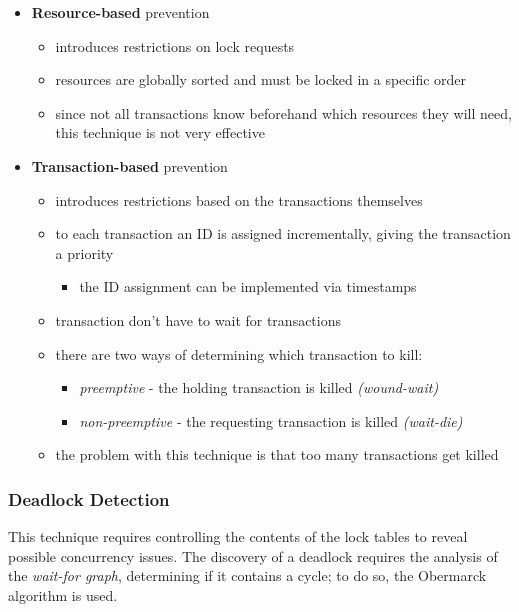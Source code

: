 \documentclass[english]{article}
\begin{document}
\begin{itemize}
  \item \textbf{Resource-based} prevention
        \begin{itemize}
          \item introduces restrictions on lock requests
          \item resources are globally sorted and must be locked in a specific order
          \item since not all transactions know beforehand which resources they will need, this technique is not very effective
        \end{itemize}
  \item \textbf{Transaction-based} prevention
        \begin{itemize}
          \item introduces restrictions based on the transactions themselves
          \item to each transaction an ID is assigned incrementally, giving the transaction a priority
                \begin{itemize}
                  \item the ID assignment can be implemented via timestamps
                \end{itemize}
          \item {} transaction don't have to wait for  transactions
          \item there are two ways of determining which transaction to kill:
                \begin{itemize}
                  \item \textit{preemptive} - the holding transaction is killed \textit{(wound-wait)}
                  \item \textit{non-preemptive} - the requesting transaction is killed \textit{(wait-die)}
                \end{itemize}
          \item the problem with this technique is that too many transactions get killed
        \end{itemize}
\end{itemize}

\subsubsection{Deadlock Detection}

This technique requires controlling the contents of the lock tables to reveal possible concurrency issues.
The discovery of a deadlock requires the analysis of the \textit{wait-for graph}, determining if it contains a cycle;
to do so, the Obermarck algorithm is used.
\end{document}

